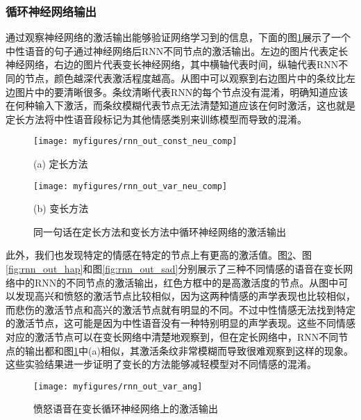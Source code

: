 \subsubsection{循环神经网络输出}
\label{sec:var_len_experiement_rnn}

通过观察神经网络的激活输出能够验证网络学习到的信息，下面的图\ref{fig:rnn_out_comp}展示了一个中性语音的句子通过神经网络后RNN不同节点的激活输出。左边的图片代表定长神经网络，右边的图片代表变长神经网络，其中横轴代表时间，纵轴代表RNN不同的节点，颜色越深代表激活程度越高。从图中可以观察到右边图片中的条纹比左边图片中的要清晰很多。条纹清晰代表RNN的每个节点没有混淆，明确知道应该在何种输入下激活，而条纹模糊代表节点无法清楚知道应该在何时激活，这也就是定长方法将中性语音段标记为其他情感类别来训练模型而导致的混淆。

\begin{figure}[h]
    \vspace{-0cm}  %
    \setlength{\belowcaptionskip}{0cm}   %
    \begin{minipage}{0.48\textwidth}
        \centering
        \texttt{[image: myfigures/rnn\_out\_const\_neu\_comp]}
        \centerline{(a) 定长方法}\medskip
    \end{minipage}\hfill
    \begin{minipage}{0.48\textwidth}
        \centering
        \texttt{[image: myfigures/rnn\_out\_var\_neu\_comp]}
        \centerline{(b) 变长方法}\medskip
    \end{minipage}
    \caption{同一句话在定长方法和变长方法中循环神经网络的激活输出}
    \label{fig:rnn_out_comp}
\end{figure}

此外，我们也发现特定的情感在特定的节点上有更高的激活值。图\ref{fig:rnn_out_ang}、图\ref{fig:rnn_out_hap}和图\ref{fig:rnn_out_sad}分别展示了三种不同情感的语音在变长网络中的RNN的不同节点的激活输出，红色方框中的是高激活度的节点。从图中可以发现高兴和愤怒的激活节点比较相似，因为这两种情感的声学表现也比较相似，而悲伤的激活节点和高兴的激活节点就有明显的不同。不过中性情感无法找到特定的激活节点，这可能是因为中性语音没有一种特别明显的声学表现。这些不同情感对应的激活节点可以在变长网络中清楚地观察到，但在定长网络中，RNN不同节点的输出都和图\ref{fig:rnn_out_comp}中(a)相似，其激活条纹非常模糊而导致很难观察到这样的现象。这些实验结果进一步证明了变长的方法能够减轻模型对不同情感的混淆。

\begin{figure}[h] %
    \vspace{-0cm}  %
    \setlength{\belowcaptionskip}{0cm}   %
    \centering
    \texttt{[image: myfigures/rnn\_out\_var\_ang]}
    \caption{愤怒语音在变长循环神经网络上的激活输出}
    \label{fig:rnn_out_ang}
\end{figure}

